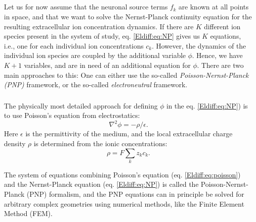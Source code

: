 \subsection{ }
\label{sec:Eldiff:frameworks}
Let us for now assume that the neuronal source terms $f_k$ are known at all points in space, and that we want to solve the Nernst-Planck continuity equation for the resulting extracellular ion concentration dynamics. If there are $K$ different ion species present in the system of study, eq. \ref{Eldiff:eq:NP} gives us $K$ equations, i.e., one for each individual ion concentrations $c_k$. However, the dynamics of the individual ion species are coupled by the additional variable $\phi$. Hence, we have $K+1$ variables, and are in need of an additional equation for $\phi$. There are two main approaches to this: One can either use the so-called \textit{Poisson-Nernst-Planck (PNP)} framework, or the so-called \textit{electroneutral} framework.

\subsubsection{}
The physically most detailed approach for defining $\phi$ in the eq. \ref{Eldiff:eq:NP}) is to use Poisson's equation from electrostatics:
\begin{equation}
\nabla^2 \phi = -\rho/\epsilon.
\label{Eldiff:eq:poisson}
\end{equation}
Here $\epsilon$ is the permittivity of the medium, and the local extracellular charge density $\rho$ is determined from the ionic concentrations: 
\begin{equation}
\rho = F \sum_k z_k c_k.
\label{Eldiff:eq:Frode}
\end{equation}

The system of equations combining Poisson's equation (eq. \ref{Eldiff:eq:poisson}) and the Nernst-Planck equation (eq. \ref{Eldiff:eq:NP})
is called the Poisson-Nernst-Planck (PNP) formalism, and the PNP equations can in principle be solved for arbitrary complex geometries using numerical methods, like the Finite Element Method (FEM). 


